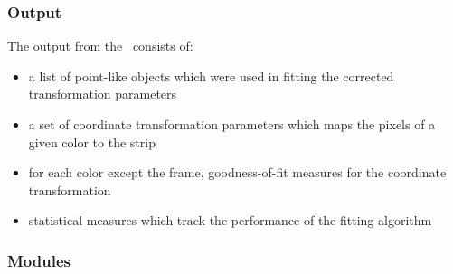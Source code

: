 \subsubsection{Output}

The output from the \mcm\ consists of:
\begin{itemize}
  \item a list of point-like objects which were used in
        fitting the corrected transformation parameters
  \item a set of
        coordinate transformation parameters which maps the pixels of a given
        color to the \/ strip
  \item for each color except the \/ frame, goodness-of-fit
        measures for the coordinate transformation
  \item statistical measures which track the performance of the fitting
        algorithm
\end{itemize}

\subsubsection{Modules}
